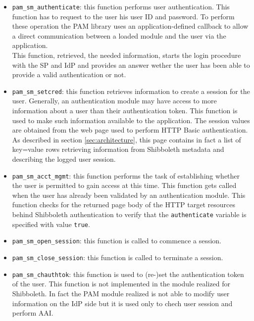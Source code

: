 \begin{itemize}
\item \texttt{pam\_sm\_authenticate}: this function performs user authentication.
This function has to request to the user his user ID and password.
To perform these operation the PAM library uses an application-defined callback to allow a direct communication between a loaded module
and the user via the application.\\
This function, retrieved, the needed information, starts the login procedure with the SP and IdP and provides an answer wether the user
has been able to provide a valid authentication or not.
\item \texttt{pam\_sm\_setcred}: this function retrieves information to create a session for the user.
Generally, an authentication module may have access to more information about a user than their authentication token.
This function is used to make such information available to the application.
The session values are obtained from the web page used to perform HTTP Basic authentication.
As described in section \ref{sec:architecture}, this page contains in fact a list of key=value rows retrieving information from Shibboleth
metadata and describing the logged user session.
\item \texttt{pam\_sm\_acct\_mgmt}: this function performs the task of establishing whether the user is permitted to gain access at this time.
This function gets called when the user has already been validated by an authentication module.
This function checks for the returned page body of the HTTP target resources behind Shibboleth authentication to verify that the
\texttt{authenticate} variable is specified with value \texttt{true}.
\item \texttt{pam\_sm\_open\_session}: this function is called to commence a session.
\item \texttt{pam\_sm\_close\_session}: this function is called to terminate a session.
\item \texttt{pam\_sm\_chauthtok}: this function is used to (re-)set the authentication token of the user.
This function is not implemented in the module realized for Shibboleth.
In fact the PAM module realized is not able to modify user information on the IdP side but it is used only to chech user session and
perform AAI.
\end{itemize}

